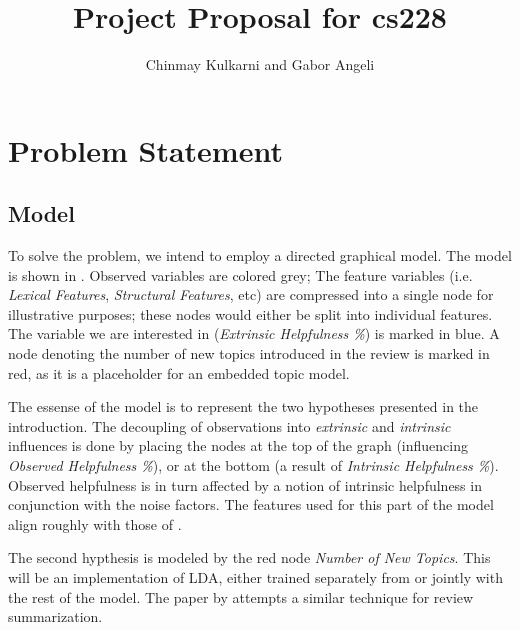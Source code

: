 \documentclass[letter,12pt]{article}
\title{Project Proposal for cs228}
\author{Chinmay Kulkarni and Gabor Angeli}
\begin{document}
\maketitle

\section{Problem Statement}

\subsection{Model}

To solve the problem, we intend to employ a directed graphical model.
The model is shown in .
Observed variables are colored grey;
The feature variables (i.e. {\em Lexical Features}, {\em Structural Features}, 
	etc) are compressed into a single node for illustrative purposes;
	these nodes would either be split into individual features.
The variable we are interested in ({\em Extrinsic Helpfulness \%}) is marked
	in blue.
A node denoting the number of new topics introduced in the review is marked
	in red, as it is a placeholder for an embedded topic model.

The essense of the model is to represent the two hypotheses presented in the
	introduction. 
The decoupling of observations into {\em extrinsic} and
	{\em intrinsic} influences is done by placing the nodes at the top
	of the graph (influencing {\em Observed Helpfulness \%}), or at the bottom
	(a result of {\em Intrinsic Helpfulness \%}).
Observed helpfulness is in turn affected by a notion of intrinsic helpfulness
	in conjunction with the noise factors.
The features used for this part of the model align roughly with those of
	.

The second hypthesis is modeled by the red node {\em Number of New Topics}.
This will be an implementation of LDA, either trained separately from or
	jointly with the rest of the model.
The paper by  attempts a similar technique
	for review summarization.
\end{document}
